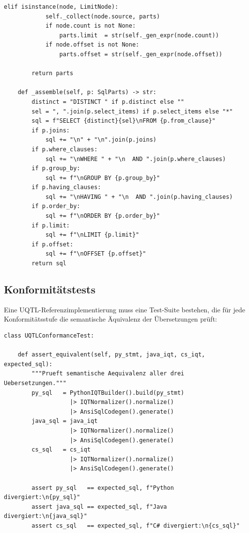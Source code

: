 \begin{lstlisting}[style=pythonstyle, caption={SQL-Codegenerator: IQT nach ANSI SQL},
  label=lst:impl_codegen]
        elif isinstance(node, LimitNode):
            self._collect(node.source, parts)
            if node.count is not None:
                parts.limit  = str(self._gen_expr(node.count))
            if node.offset is not None:
                parts.offset = str(self._gen_expr(node.offset))

        return parts

    def _assemble(self, p: SqlParts) -> str:
        distinct = "DISTINCT " if p.distinct else ""
        sel = ", ".join(p.select_items) if p.select_items else "*"
        sql = f"SELECT {distinct}{sel}\nFROM {p.from_clause}"
        if p.joins:
            sql += "\n" + "\n".join(p.joins)
        if p.where_clauses:
            sql += "\nWHERE " + "\n  AND ".join(p.where_clauses)
        if p.group_by:
            sql += f"\nGROUP BY {p.group_by}"
        if p.having_clauses:
            sql += "\nHAVING " + "\n  AND ".join(p.having_clauses)
        if p.order_by:
            sql += f"\nORDER BY {p.order_by}"
        if p.limit:
            sql += f"\nLIMIT {p.limit}"
        if p.offset:
            sql += f"\nOFFSET {p.offset}"
        return sql
\end{lstlisting}

\subsection{Konformitätstests}
\label{subsec:impl_tests}

Eine UQTL-Referenzimplementierung muss eine Test-Suite bestehen, die für
jede Konformitätsstufe die semantische Äquivalenz der Übersetzungen prüft:

\begin{lstlisting}[style=pythonstyle, caption={Konformitätstest-Schablone},
  label=lst:impl_test]
class UQTLConformanceTest:

    def assert_equivalent(self, py_stmt, java_iqt, cs_iqt, expected_sql):
        """Prueft semantische Aequivalenz aller drei Uebersetzungen."""
        py_sql   = PythonIQTBuilder().build(py_stmt)
                   |> IQTNormalizer().normalize()
                   |> AnsiSqlCodegen().generate()
        java_sql = java_iqt
                   |> IQTNormalizer().normalize()
                   |> AnsiSqlCodegen().generate()
        cs_sql   = cs_iqt
                   |> IQTNormalizer().normalize()
                   |> AnsiSqlCodegen().generate()

        assert py_sql   == expected_sql, f"Python divergiert:\n{py_sql}"
        assert java_sql == expected_sql, f"Java divergiert:\n{java_sql}"
        assert cs_sql   == expected_sql, f"C# divergiert:\n{cs_sql}"
\end{lstlisting}

